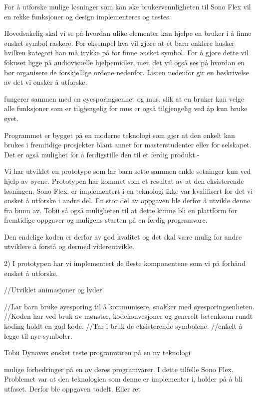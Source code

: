 {For å utforske mulige løsninger som kan øke brukervennligheten til Sono Flex  vil en rekke funksjoner og design implementeres og testes. 

Hovedsakelig skal vi se på hvordan ulike elementer kan hjelpe en bruker i å finne ønsket symbol raskere. For eksempel hva vil gjøre at et barn enklere husker hvilken kategori han må trykke på for finne ønsket symbol. For å gjøre dette vil fokuset ligge på audiovisuelle hjelpemidler, men det vil også ses på hvordan en bør organisere de forskjellige ordene nedenfor. Listen nedenfor gir en  beskrivelse av det vi ønsker å utforske.



fungerer sammen med en øyesporingsenhet og mus, slik at en bruker kan velge alle funksjoner som er tilgjengelig for mus er også tilgjengelig ved åp kun bruke øyet.

Programmet er bygget på en moderne teknologi som gjør at den enkelt kan brukes i fremitdige prosjekter blant annet for masterstudenter eller for selskapet. Det er også mulighet for å ferdigstille den til et ferdig produkt.-



Vi har utviklet en prototype som lar barn sette sammen enkle setninger kun ved hjelp av øyene. Prototypen har kommet som et resultat av at den eksisterende løsningen, Sono Flex, er implementert i en teknologi ikke var kvalifisert for det vi ønsket å utforske i andre del. En stor del av oppgaven ble derfor å utvikle denne fra bunn av. Tobii så også muligheten til at dette kunne bli en plattform for fremtidige oppgaver og muligens starten på en ferdig programvare. 




Den endelige koden er derfor av god kvalitet og det skal være mulig for andre utviklere å forstå og dermed videreutvikle. 


2) I prototypen har vi implementert de fleste komponentene som vi på forhånd ønsket å utforske. 


//Utviklet animasjoner og lyder


//Lar barn bruke øyesporing til å kommunisere, snakker med øyesporingsenheten.
//Koden har ved bruk av mønster, kodekonvesjoner og generelt betenksom rundt koding holdt en god kode.
//Tar i bruk de eksisterende symbolene.
//enkelt å legge til nye symboler.

Tobii Dynavox ønsket teste programvaren på en ny teknologi 

mulige forbedringer på en av deres programvarer. I dette tilfelle Sono Flex. Problemet var at den teknologien som denne er implementer i, holder på å bli utfaset. Derfor ble oppgaven todelt. Eller ret


}
